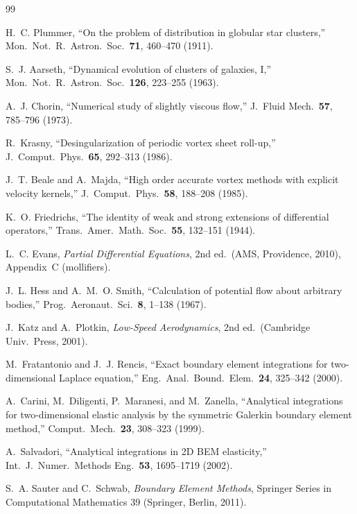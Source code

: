 \documentclass[11pt]{article}
\begin{document}
\begin{thebibliography}{99}\small

 H.~C. Plummer,
``On the problem of distribution in globular star clusters,''
Mon.\ Not.\ R.\ Astron.\ Soc.\ \textbf{71}, 460--470 (1911).

 S.~J. Aarseth,
``Dynamical evolution of clusters of galaxies, I,''
Mon.\ Not.\ R.\ Astron.\ Soc.\ \textbf{126}, 223--255 (1963).

 A.~J. Chorin,
``Numerical study of slightly viscous flow,''
J.\ Fluid Mech.\ \textbf{57}, 785--796 (1973).

 R.~Krasny,
``Desingularization of periodic vortex sheet roll-up,''
J.\ Comput.\ Phys.\ \textbf{65}, 292--313 (1986).

 J.~T. Beale and A.~Majda,
``High order accurate vortex methods with explicit velocity kernels,''
J.\ Comput.\ Phys.\ \textbf{58}, 188--208 (1985).

 K.~O. Friedrichs,
``The identity of weak and strong extensions of differential operators,''
Trans.\ Amer.\ Math.\ Soc.\ \textbf{55}, 132--151 (1944).

 L.~C. Evans,
\emph{Partial Differential Equations}, 2nd ed.\ (AMS, Providence, 2010),
Appendix~C (mollifiers).

 J.~L. Hess and A.~M.~O. Smith,
``Calculation of potential flow about arbitrary bodies,''
Prog.\ Aeronaut.\ Sci.\ \textbf{8}, 1--138 (1967).

 J.~Katz and A.~Plotkin,
\emph{Low-Speed Aerodynamics}, 2nd ed.\ (Cambridge Univ.\ Press, 2001).

 M.~Fratantonio and J.~J. Rencis,
``Exact boundary element integrations for two-dimensional Laplace equation,''
Eng.\ Anal.\ Bound.\ Elem.\ \textbf{24}, 325--342 (2000).

 A.~Carini, M.~Diligenti, P.~Maranesi, and M.~Zanella,
``Analytical integrations for two-dimensional elastic analysis by the symmetric
Galerkin boundary element method,''
Comput.\ Mech.\ \textbf{23}, 308--323 (1999).

 A.~Salvadori,
``Analytical integrations in 2D BEM elasticity,''
Int.\ J.\ Numer.\ Methods Eng.\ \textbf{53}, 1695--1719 (2002).

 S.~A. Sauter and C.~Schwab,
\emph{Boundary Element Methods}, Springer Series in Computational Mathematics 39
(Springer, Berlin, 2011).


\end{thebibliography}
\end{document}

